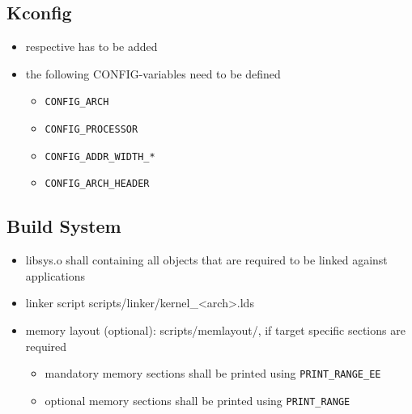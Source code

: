	\subsection{Kconfig}
		\begin{itemize}
			\item respective  has to be added
			\item the following CONFIG-variables need to be defined
				\begin{itemize}
					\item \lstinline{CONFIG_ARCH}
					\item \lstinline{CONFIG_PROCESSOR}
					\item \lstinline{CONFIG_ADDR_WIDTH_*}
					\item \lstinline{CONFIG_ARCH_HEADER}
				\end{itemize}
		\end{itemize}

	\subsection{Build System}
		\begin{itemize}
			\item libsys.o shall containing all objects that are required to be linked against applications
			\item linker script scripts/linker/kernel\_<arch>.lds
			\item memory layout (optional): scripts/memlayout/, if target specific sections are required
				\begin{itemize}
					\item mandatory memory sections shall be printed using \lstinline{PRINT_RANGE_EE}
					\item optional memory sections shall be printed using \lstinline{PRINT_RANGE}
				\end{itemize}
		\end{itemize}

\vfill
\pagebreak

